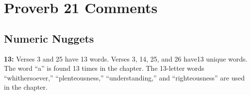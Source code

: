 \section{Proverb 21 Comments}

\subsection{Numeric Nuggets}
\textbf{13: } Verses 3 and 25 have 13 words. Verses 3, 14, 25, and 26 have13 unique words. The word ``a'' is found 13 times in the chapter. The 13-letter words ``whithersoever,'' ``plenteousness,'' ``understanding,'' and ``righteousness'' are used in the chapter.

